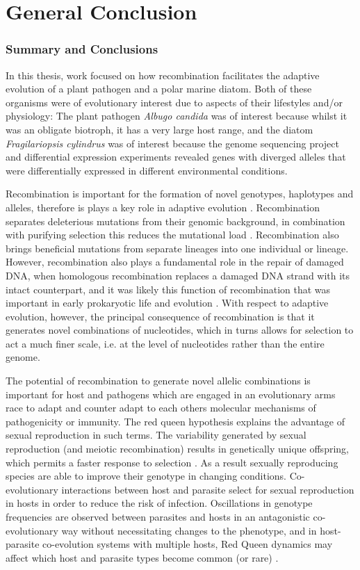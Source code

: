 \chapter{General Conclusion}

\subsection{Summary and Conclusions}

In this thesis, work focused on how recombination facilitates the adaptive evolution of a plant pathogen and a polar marine diatom.
Both of these organisms were of evolutionary interest due to aspects of their lifestyles and/or physiology:
The plant pathogen \textit{Albugo candida} was of interest because whilst it was an obligate biotroph, it has a very large host range, and the diatom \textit{Fragilariopsis cylindrus} was of interest because the genome sequencing project and differential expression experiments revealed genes with diverged alleles that were differentially expressed in different environmental conditions.

Recombination is important for the formation of novel genotypes, haplotypes and alleles, therefore is plays a key role in adaptive evolution \parencite{Grauer2000}.
Recombination separates deleterious mutations from their genomic background, in combination with purifying selection this reduces the mutational load \parencite{Lynch1990a}.
Recombination also brings beneficial mutations from separate lineages into one individual or lineage.
However, recombination also plays a fundamental role in the repair of damaged DNA, when homologous recombination replaces a damaged DNA strand with its intact counterpart, and it was likely this function of recombination that was important in early prokaryotic life and evolution \parencite{Cavalier-Smith2002}.
With respect to adaptive evolution, however, the principal consequence of recombination is that it generates novel combinations of nucleotides, which in turns allows for selection to act a much finer scale, i.e. at the level of nucleotides rather than the entire genome.

The potential of recombination to generate novel allelic combinations is important for host and pathogens which are engaged in an evolutionary arms race to adapt and counter adapt to each others molecular mechanisms of pathogenicity or immunity.
The red queen hypothesis explains the advantage of sexual reproduction in such terms.
The variability generated by sexual reproduction (and meiotic recombination) results in genetically unique offspring, which permits a faster response to selection \parencite{Paterson2010}.
As a result sexually reproducing species are able to improve their genotype in changing conditions. 
Co-evolutionary interactions between host and parasite select for sexual reproduction in hosts in order to reduce the risk of infection.
Oscillations in genotype frequencies are observed between parasites and hosts in an antagonistic co-evolutionary way without necessitating changes to the phenotype, and in host-parasite co-evolution systems with multiple hosts, Red Queen dynamics may affect which host and parasite types become common (or rare) \parencite{Charlesworth2010}.

